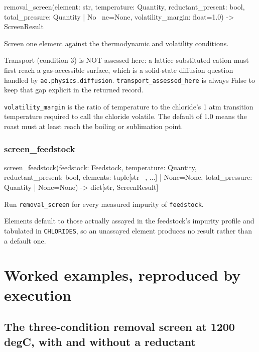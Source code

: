 \documentclass[10pt,a4paper,twoside]{report}
\begin{document}
\begin{verbatimsmall}
removal_screen(element: str, temperature: Quantity, reductant_present: bool, total_pressure: Quantity | No
    \ ne=None, volatility_margin: float=1.0) -> ScreenResult
\end{verbatimsmall}

Screen one element against the thermodynamic and volatility conditions.

Transport (condition 3) is NOT assessed here: a lattice-substituted cation must first reach a gas-accessible surface, which is a solid-state diffusion question handled by \texttt{ae.physics.diffusion}. \texttt{transport\_assessed\_here} is always False to keep that gap explicit in the returned record.

\texttt{volatility\_margin} is the ratio of temperature to the chloride's 1 atm transition temperature required to call the chloride volatile. The default of 1.0 means the roast must at least reach the boiling or sublimation point.

\subsubsection*{screen\_feedstock}

\begin{verbatimsmall}
screen_feedstock(feedstock: Feedstock, temperature: Quantity, reductant_present: bool, elements: tuple[str
    \ , ...] | None=None, total_pressure: Quantity | None=None) -> dict[str, ScreenResult]
\end{verbatimsmall}

Run \texttt{removal\_screen} for every measured impurity of \texttt{feedstock}.

Elements default to those actually assayed in the feedstock's impurity profile and tabulated in \texttt{CHLORIDES}, so an unassayed element produces no result rather than a default one.

\section{Worked examples, reproduced by execution}

\subsection*{The three-condition removal screen at 1200 degC, with and without a reductant}
\end{document}
